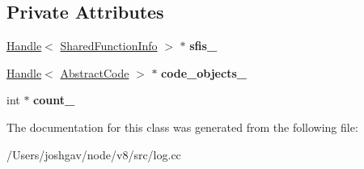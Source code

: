 \subsection*{Private Attributes}
\begin{DoxyCompactItemize}
\item 
\hyperlink{classv8_1_1internal_1_1_handle}{Handle}$<$ \hyperlink{classv8_1_1internal_1_1_shared_function_info}{Shared\+Function\+Info} $>$ $\ast$ {\bfseries sfis\+\_\+}\hypertarget{classv8_1_1internal_1_1_enumerate_optimized_functions_visitor_ae49df708e2e93dd8b13f18e4089d07f9}{}\label{classv8_1_1internal_1_1_enumerate_optimized_functions_visitor_ae49df708e2e93dd8b13f18e4089d07f9}

\item 
\hyperlink{classv8_1_1internal_1_1_handle}{Handle}$<$ \hyperlink{classv8_1_1internal_1_1_abstract_code}{Abstract\+Code} $>$ $\ast$ {\bfseries code\+\_\+objects\+\_\+}\hypertarget{classv8_1_1internal_1_1_enumerate_optimized_functions_visitor_a53b99e7145e30288de8c9e62638bb8ab}{}\label{classv8_1_1internal_1_1_enumerate_optimized_functions_visitor_a53b99e7145e30288de8c9e62638bb8ab}

\item 
int $\ast$ {\bfseries count\+\_\+}\hypertarget{classv8_1_1internal_1_1_enumerate_optimized_functions_visitor_aacb0732509377b8e4af3527ea83069fe}{}\label{classv8_1_1internal_1_1_enumerate_optimized_functions_visitor_aacb0732509377b8e4af3527ea83069fe}

\end{DoxyCompactItemize}


The documentation for this class was generated from the following file\+:\begin{DoxyCompactItemize}
\item 
/\+Users/joshgav/node/v8/src/log.\+cc\end{DoxyCompactItemize}
